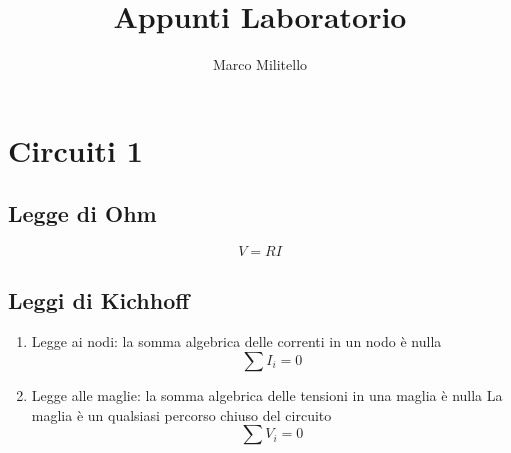 \documentclass[a4paper,11pt]{article}
\begin{document}
	\date{}
	\author{Marco Militello}
	\title{Appunti Laboratorio}
	\maketitle
	\newpage
	
\section*{Circuiti 1}

\subsection*{Legge di Ohm}
\begin{equation*}
    V = RI
\end{equation*}

\subsection*{Leggi di Kichhoff}

\begin{enumerate}
    \item Legge ai nodi: la somma algebrica delle correnti in un nodo è nulla
    \begin{equation*}
        \sum I_i =0
    \end{equation*}
    \item Legge alle maglie: la somma algebrica delle tensioni in una maglia è nulla \newline
    La maglia è un qualsiasi percorso chiuso del circuito
    \begin{equation*}
        \sum V_i =0
    \end{equation*}
\end{enumerate}
\end{document}
